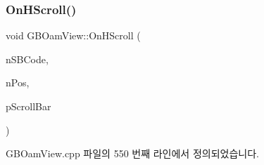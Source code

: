 \subsubsection{\texorpdfstring{On\+H\+Scroll()}{OnHScroll()}}
{\footnotesize\ttfamily void G\+B\+Oam\+View\+::\+On\+H\+Scroll (\begin{DoxyParamCaption}\item[{U\+I\+NT}]{n\+S\+B\+Code,  }\item[{U\+I\+NT}]{n\+Pos,  }\item[{C\+Scroll\+Bar $\ast$}]{p\+Scroll\+Bar }\end{DoxyParamCaption})\hspace{0.3cm}{\ttfamily [protected]}}



G\+B\+Oam\+View.\+cpp 파일의 550 번째 라인에서 정의되었습니다.


